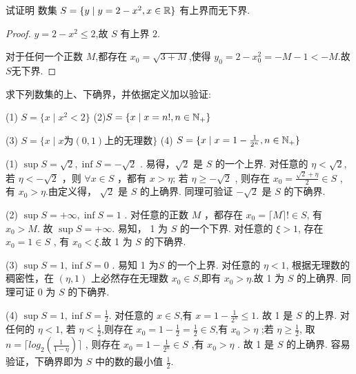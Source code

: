 \begin{practice}
    试证明 数集 $S=\{y\mid y=2-x^2,x\in \mathbb{R}\}$ 有上界而无下界.
\end{practice}

\begin{proof}
    $y=2-x^2\le 2$,故 $S$ 有上界 $2$.

     对于任何一个正数 $M$,都存在 $x_0=\sqrt{3+M}$,使得 $y_0=2-x_0^2=-M-1<-M$.故 $S$无下界.
\end{proof}

\begin{practice}
    求下列数集的上、下确界，并依据定义加以验证:

    (1) $S=\{x\mid x^2<2\}$ \qquad (2)$S=\{x \mid x=n! ,n\in \mathbb{N}_+ \}$

    (3) $S=\{ x\mid x\mbox{为} (0,1) \mbox{上的无理数} \}$ \qquad (4) $S=\{ x \mid x=1-\frac{1}{2^n},n\in \mathbb{N}_+\}$
\end{practice}

\begin{solve}
    (1) $\sup S = \sqrt{2},\inf S = -\sqrt{2}$ . 
    易得，$\sqrt{2}$ 是 $S$ 的一个上界. 对任意的 $\eta<\sqrt{2}$, 若 $\eta<-\sqrt{2}$ ，则 $\forall x\in S$ ，都有 $x>\eta $; 若 $\eta \ge -\sqrt{2}$ , 则存在 $x_0 = \frac{\sqrt{2}+\eta}{2} \in S$ , 有 $x_0>\eta $.由定义得， $\sqrt{2}$ 是 $S$ 的上确界. 同理可验证 $-\sqrt{2}$ 是 $S$ 的下确界.

    (2) $\sup S = +\infty,\inf S = 1$ . 对任意的正数 $M$ ，都存在 $x_0 = \lceil M \rceil ! \in S$, 有 $x_0>M$. 故 $\sup S = +\infty$. 易知， 1 为 $S$ 的一个下界. 对任意的 $ \xi> 1$, 存在 $x_0=1\in S$ , 有 $x_0<\xi$.故 1 为 $S$ 的下确界.

    (3) $\sup S = 1,\inf S = 0$  . 易知 1 为$S$ 的一个上界. 对任意的 $\eta < 1$, 根据无理数的稠密性，在 $(\eta,1)$ 上必然存在无理数 $x_0\in S$,即有 $x_0>\eta$.故 1 为 $S$ 的上确界. 同理可证 $0$ 为 $S$ 的下确界.

    (4) $\sup S = 1,\inf S = \frac{1}{2}$. 对任意的 $x\in S$,有 $x=1-\frac{1}{2^n}\le 1$. 故 1 是 $S$ 的上界. 对任何的 $\eta <1$, 若 $\eta<\frac{1}{2}$,则存在 $x_0=1-\frac{1}{2}=\frac{1}{2} \in S$,有 $x_0>\eta$ ;若 $\eta\ge \frac{1}{2}$, 取 $n=\lceil log_2(\frac{1}{1 - \eta}) \rceil$ , 则存在 $x_0 = 1-\frac{1}{2^n} \in S$ ,有 $x_0>\eta$ . 故 1 是 $S$ 的上确界. 容易验证，下确界即为 $S$ 中的数的最小值 $\frac{1}{2}$.
\end{solve}

